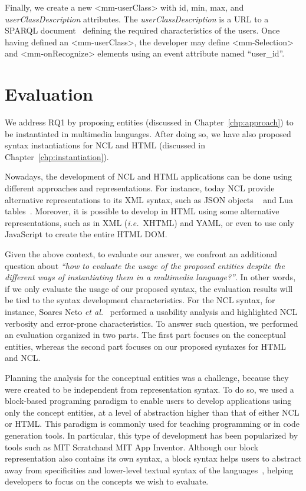 \documentclass[
  doutorado,
  american
]{ThesisPUC}
\newcommand{\chp}[1]{Chapter~\ref{#1}}
\begin{document}
Finally, we create a new <mm-userClass> with id, min, max, and 
\textit{userClassDescription} attributes. The \textit{userClassDescription} is 
a URL to a SPARQL 
document~\cite{w3c_sparql_2008} defining the required characteristics of the users. Once having 
defined an <mm-userClass>, the developer may define <mm-Selection> and 
<mm-onRecognize> elements using an event attribute named “user\_id”.

\chapter{Evaluation}
\label{chp:evaluation}

We address RQ1 by proposing entities (discussed in \chp{chp:approach}) to be 
instantiated
in multimedia languages. After doing so, we have also proposed syntax
instantiations for NCL and HTML (discussed in \chp{chp:instantiation}).

Nowadays, the development of NCL and HTML applications can be done using
different approaches and representations. For instance, today NCL provide
alternative representations to its XML syntax, such as JSON objects
~\cite{silva_jns:_2013} and Lua tables~\cite{moraes_lua2ncl:_2016}. Moreover, 
it is possible to develop in HTML using some alternative representations, such 
as in XML (\textit{i.e.}~XHTML) and YAML, or even to use only JavaScript to 
create the entire HTML DOM. 

Given the above context, to evaluate our answer, we confront an additional
question about \textit{“how to evaluate the usage of the proposed entities 
despite the different ways of instantiating them in a multimedia language?”}. 
In other words, if we only evaluate the usage of our proposed syntax, the 
evaluation results will be tied to the syntax development characteristics. For 
the NCL syntax, for instance, Soares Neto \textit{et 
al.}~\cite{de_salles_soares_neto_linguagens_2008}
performed a usability analysis and highlighted NCL verbosity and error-prone
characteristics. To answer such question, we performed an evaluation organized
in two parts. The first part focuses on the conceptual entities, whereas the
second part focuses on our proposed syntaxes for HTML and NCL. 

Planning the analysis for the conceptual entities was a challenge, because they
were created to be independent from representation syntax. To do so, we used a
block-based programing paradigm to enable users to develop applications using
only the concept entities, at a level of abstraction higher than that of either
NCL or HTML. This paradigm is commonly used for teaching programming or in code
generation tools. In particular, this type of development has been popularized
by tools such as MIT Scratch\footnotemark and MIT App Inventor\footnotemark. 
Although our block representation also contains its own syntax, a block syntax 
helps users to abstract away from specificities and lower-level textual syntax 
of the languages~\cite{shapiro_beyond_2016}, helping developers to focus on the 
concepts we wish to evaluate. 
\end{document}
